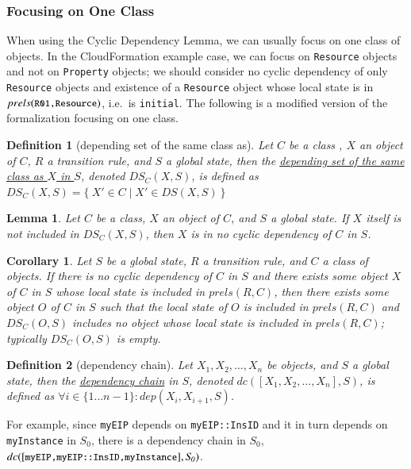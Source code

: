 \documentclass[12pt]{report}
\newtheorem{lemma}{Lemma}
\newtheorem{corollary}{Corollary}
\newtheorem{definition}{Definition}
\newcommand{\mbstt}[1]{\mbox{\small{\tt {#1}}}}
\newcommand{\ul}{\underline}
\begin{document}
\subsubsection{Focusing on One Class}
When using the Cyclic Dependency Lemma, we can usually focus on one
class of objects. In the CloudFormation example case, we can focus on
{\tt Resource} objects and not on {\tt Property} objects; we should
consider no cyclic dependency of only {\tt Resource} objects and
existence of a {\tt Resource} object whose local state is in
$prels(\mbstt{R01,Resource})$, i.e.\ is {\tt initial}. The following
is a modified version of the formalization focusing on one class.

\begin{definition}[depending set of the same class as]
Let $C$ be a class , $X$ an object of $C$, $R$ a transition
rule, and $S$ a global state, then the \ul{depending set of the same
class as $X$ in $S$}, denoted \ul{$\mathit{DS_C}(X,S)$}, is defined
as $\mathit{DS_C}(X,S)=\{~X'\in C\mid X'\in DS(X,S)~\}$
\end{definition}
\begin{lemma}
Let $C$ be a class, $X$ an object of $C$, and $S$ a global
state. If $X$ itself is not included in $\mathit{DS_C}(X,S)$, then $X$ is in no
cyclic dependency of $C$ in $S$.
\end{lemma}
\begin{corollary}
Let $S$ be a global state, $R$ a transition rule, and $C$ a
class of objects. If there is no cyclic dependency of $C$ in $S$ and
there exists some object $X$ of $C$ in $S$ whose local state is
included in $prels(R,C)$, then there exists some object $O$ of $C$ in
$S$ such that the local state of $O$ is included in $prels(R,C)$ and
$\mathit{DS_C}(O,S)$ includes no object whose local state is included in
$prels(R,C)$; typically $\mathit{DS_C}(O,S)$ is empty.
\end{corollary}
\begin{definition}[dependency chain]
Let $X_1, X_2, \dots,X_n$ be objects, and $S$ a global state, then the
\ul{dependency chain} in $S$, denoted \ul{$dc([X_1, X_2,\dots,
    X_n],S)$}, is defined as $\forall i \in \{1 \dots n-1\} : \mathit{dep}(X_i,
X_{i+1},S)$.
\end{definition}
For example, since {\tt myEIP} depends on {\tt myEIP::InsID} and it in
turn depends on {\tt myInstance} in $\mathit{S_0}$, there is a dependency chain
in $\mathit{S_0}$, $dc([\mbstt{myEIP,myEIP::InsID,myInstance}],\mathit{S_0})$.
\end{document}
